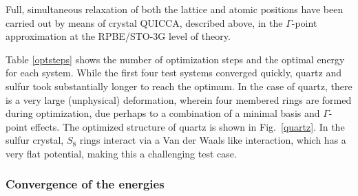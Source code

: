 \twolinestyle{\documentclass[prb,preprint]{revtex4}}
\begin{document}
Full, simultaneous relaxation of both the lattice and atomic positions have been carried out by means of 
crystal QUICCA, described above, in the $\Gamma$-point approximation at the RPBE/STO-3G level of theory. 

Table \ref{optsteps} shows the number of optimization steps and
the optimal energy for each system. While the first four test systems converged quickly,
quartz and sulfur took substantially longer to reach the optimum.
In the case of quartz, there is a very large (unphysical) deformation, wherein
four membered rings are formed during optimization, due perhaps to a combination of a minimal
basis and $\Gamma$-point effects.  The optimized structure of quartz is shown in Fig.~\ref{quartz}.
In the sulfur crystal, $S_{8}$ rings interact via a Van der Waals like interaction, which has a 
very flat potential, making this a challenging test case. 


\subsubsection{Convergence of the energies}
\end{document}
